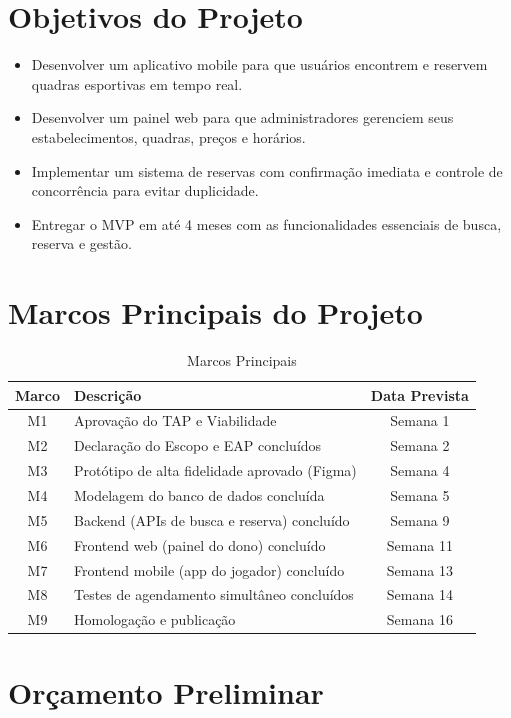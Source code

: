 \documentclass[12pt,a4paper,oneside]{report}
\begin{document}
\section{Objetivos do Projeto}

\begin{itemize}
    \item Desenvolver um aplicativo mobile para que usuários encontrem e reservem quadras esportivas em tempo real.
    \item Desenvolver um painel web para que administradores gerenciem seus estabelecimentos, quadras, preços e horários.
    \item Implementar um sistema de reservas com confirmação imediata e controle de concorrência para evitar duplicidade.
    \item Entregar o MVP em até 4 meses com as funcionalidades essenciais de busca, reserva e gestão.
\end{itemize}

\section{Marcos Principais do Projeto}

\begin{table}[htbp]
\centering
\caption{Marcos Principais}
\begin{tabular}{c p{8cm} c}
\toprule
\textbf{Marco} & \textbf{Descrição} & \textbf{Data Prevista} \\
\midrule
M1 & Aprovação do TAP e Viabilidade & Semana 1 \\
M2 & Declaração do Escopo e EAP concluídos & Semana 2 \\
M3 & Protótipo de alta fidelidade aprovado (Figma) & Semana 4 \\
M4 & Modelagem do banco de dados concluída & Semana 5 \\
M5 & Backend (APIs de busca e reserva) concluído & Semana 9 \\
M6 & Frontend web (painel do dono) concluído & Semana 11 \\
M7 & Frontend mobile (app do jogador) concluído & Semana 13 \\
M8 & Testes de agendamento simultâneo concluídos & Semana 14 \\
M9 & Homologação e publicação & Semana 16 \\
\bottomrule
\end{tabular}
\end{table}

\section{Orçamento Preliminar}
\end{document}

